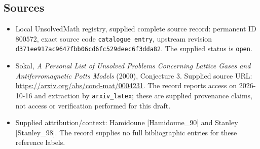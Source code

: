 \documentclass[11pt]{article}
\begin{document}
\subsection{Sources}
\begin{itemize}
\item Local UnsolvedMath registry, supplied complete source record: permanent ID \(800572\), exact source code \texttt{catalogue entry}, upstream revision \texttt{d371ee917ac9647fbb06cd6fc529deec6f3dda82}. The supplied status is \texttt{open}.
\item Sokal, \emph{A Personal List of Unsolved Problems Concerning Lattice Gases and Antiferromagnetic Potts Models} (2000), Conjecture 3. Supplied source URL: \url{https://arxiv.org/abs/cond-mat/0004231}. The record reports access on 2026-10-16 and extraction by \texttt{arxiv\_latex}; these are supplied provenance claims, not access or verification performed for this draft.
\item Supplied attribution/context: Hamidoune [Hamidoune\_90] and Stanley [Stanley\_98]. The record supplies no full bibliographic entries for these reference labels.
\end{itemize}
\end{document}
